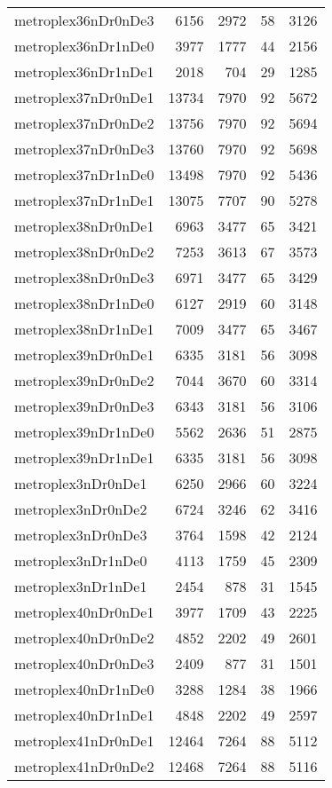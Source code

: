 \begin{longtable}{lrrrr}
metroplex36nDr0nDe3 & 6156 & 2972 & 58 & 3126 \\
metroplex36nDr1nDe0 & 3977 & 1777 & 44 & 2156 \\
metroplex36nDr1nDe1 & 2018 & 704 & 29 & 1285 \\
metroplex37nDr0nDe1 & 13734 & 7970 & 92 & 5672 \\
metroplex37nDr0nDe2 & 13756 & 7970 & 92 & 5694 \\
metroplex37nDr0nDe3 & 13760 & 7970 & 92 & 5698 \\
metroplex37nDr1nDe0 & 13498 & 7970 & 92 & 5436 \\
metroplex37nDr1nDe1 & 13075 & 7707 & 90 & 5278 \\
metroplex38nDr0nDe1 & 6963 & 3477 & 65 & 3421 \\
metroplex38nDr0nDe2 & 7253 & 3613 & 67 & 3573 \\
metroplex38nDr0nDe3 & 6971 & 3477 & 65 & 3429 \\
metroplex38nDr1nDe0 & 6127 & 2919 & 60 & 3148 \\
metroplex38nDr1nDe1 & 7009 & 3477 & 65 & 3467 \\
metroplex39nDr0nDe1 & 6335 & 3181 & 56 & 3098 \\
metroplex39nDr0nDe2 & 7044 & 3670 & 60 & 3314 \\
metroplex39nDr0nDe3 & 6343 & 3181 & 56 & 3106 \\
metroplex39nDr1nDe0 & 5562 & 2636 & 51 & 2875 \\
metroplex39nDr1nDe1 & 6335 & 3181 & 56 & 3098 \\
metroplex3nDr0nDe1 & 6250 & 2966 & 60 & 3224 \\
metroplex3nDr0nDe2 & 6724 & 3246 & 62 & 3416 \\
metroplex3nDr0nDe3 & 3764 & 1598 & 42 & 2124 \\
metroplex3nDr1nDe0 & 4113 & 1759 & 45 & 2309 \\
metroplex3nDr1nDe1 & 2454 & 878 & 31 & 1545 \\
metroplex40nDr0nDe1 & 3977 & 1709 & 43 & 2225 \\
metroplex40nDr0nDe2 & 4852 & 2202 & 49 & 2601 \\
metroplex40nDr0nDe3 & 2409 & 877 & 31 & 1501 \\
metroplex40nDr1nDe0 & 3288 & 1284 & 38 & 1966 \\
metroplex40nDr1nDe1 & 4848 & 2202 & 49 & 2597 \\
metroplex41nDr0nDe1 & 12464 & 7264 & 88 & 5112 \\
metroplex41nDr0nDe2 & 12468 & 7264 & 88 & 5116 \\

\end{longtable}
